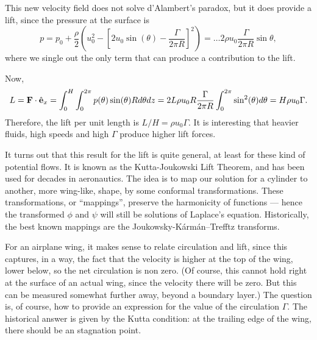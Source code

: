 This new velocity field does not solve d'Alambert's paradox, but it
does provide a lift, since the pressure at the surface is
\[
p= p_0 + \frac{\rho}2   \left(u_0^2 -  \left[ 2  u_0 \sin(\theta) - \frac{\Gamma}{2\pi R} \right]^2 \right) =
\ldots  2 \rho u_0   \frac{\Gamma}{2\pi R} \sin\theta ,
\]
where we single out the only term that can produce a contribution to the lift.

Now,
\begin{equation}
  \label{eq:lift_potential_cyl}
  L= \mathbf{F} \cdot \hat{\mathbf{e}}_x = \int_0^H \int_0^{2\pi}
  p(\theta) \sin(\theta) R d\theta dz =
  2 L  \rho u_0  R  \frac{\Gamma}{2\pi R}   \int_0^{2\pi}  \sin^2(\theta) d\theta =
  H \rho u_0   \Gamma .
\end{equation}
Therefore, the lift per unit length is $L/H= \rho u_0 \Gamma$. It is
interesting that heavier fluids, high speeds and high $\Gamma$ produce
higher lift forces.

It turns out that this result for the lift is quite general, at least
for these kind of potential flows. It is known as the Kutta-Joukowski
Lift Theorem, and has been used for decades in aeronautics. The idea
is to map our solution for a cylinder to another, more wing-like,
shape, by some conformal transformations. These transformations, or
``mappings'', preserve the harmonicity of functions --- hence the
transformed $\phi$ and $\psi$ will still be solutions of Laplace's
equation. Historically, the best known mappings are the Joukowsky-K\'arm\'an–Trefftz transforms.

For an airplane wing, it makes sense to relate circulation and lift, since
this captures, in a way, the fact that the velocity is higher at the
top of the wing, lower below, so the net circulation is non zero. (Of
course, this cannot hold right at the surface of an actual wing, since
the velocity there will be zero. But this can be measured somewhat
further away, beyond a boundary layer.) The question is, of course,
how to provide an expression for the value of the circulation $\Gamma$.
The historical answer is given by the Kutta condition: at the trailing
edge of the wing, there should be an stagnation point.

